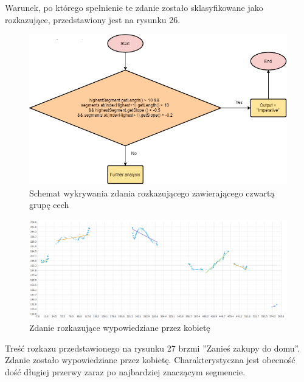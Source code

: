 \documentclass[a4paper,12 pt]{report}
\begin{document}
Warunek, po którego spełnienie te zdanie zostało sklasyfikowane jako rozkazujące, przedstawiony jest na rysunku 26.
 \FloatBarrier
\begin{figure}[h]
\centering
\includegraphics[scale=0.9]{Imperative4.png}
\caption{Schemat wykrywania zdania rozkazującego zawierającego czwartą grupę cech}
\end{figure}
\FloatBarrier
 \FloatBarrier
\begin{figure}[h]
\centering
\includegraphics[scale=0.6]{rozkaz_5_kobieta.png}
\caption{Zdanie rozkazujące wypowiedziane przez kobietę}
\end{figure}
\FloatBarrier
Treść rozkazu przedstawionego na rysunku 27 brzmi ''Zanieś zakupy do domu''. Zdanie zostało wypowiedziane przez kobietę. Charakterystyczna jest obecność dość długiej przerwy zaraz po najbardziej znaczącym segmencie.
\end{document}
